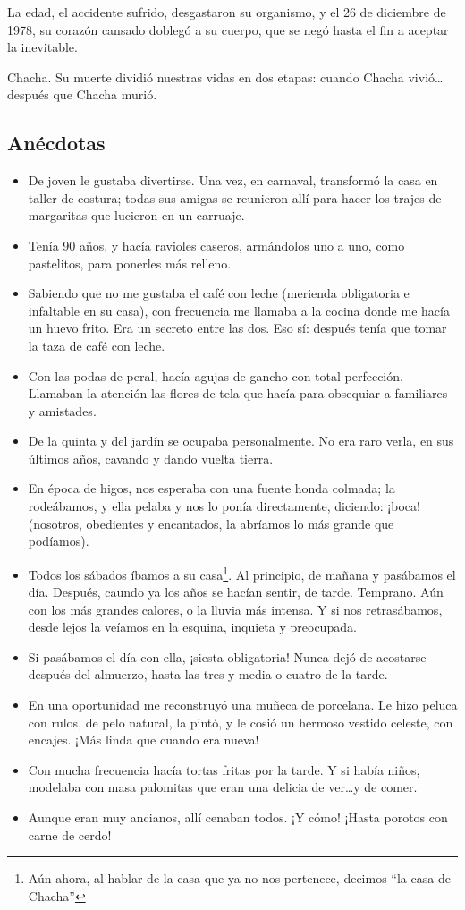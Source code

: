 \documentclass[a4paper]{article}
\begin{document}
La edad, el accidente sufrido, desgastaron su organismo, y el 26 de diciembre de 1978, su corazón cansado doblegó a su cuerpo, que se negó hasta el fin a aceptar la inevitable.

Chacha. Su muerte dividió nuestras vidas en dos etapas: cuando Chacha vivió\ldots después que Chacha murió.

\subsection{Anécdotas}

\begin{itemize}
    \item{De joven le gustaba divertirse. Una vez, en carnaval, transformó la casa en taller de costura; todas sus amigas se reunieron allí para hacer los trajes de margaritas que lucieron en un carruaje.}
    \item{Tenía 90 años, y hacía ravioles caseros, armándolos uno a uno, como pastelitos, para ponerles más relleno.}
    \item{Sabiendo que no me gustaba el café con leche (merienda obligatoria e infaltable en su casa), con frecuencia me llamaba a la cocina donde me hacía un huevo frito. Era un secreto entre las dos. Eso sí: después tenía que tomar la taza de café con leche.}
    \item{Con las podas de peral, hacía agujas de gancho con total perfección. Llamaban la atención las flores de tela que hacía para obsequiar a familiares y amistades.}
    \item{De la quinta y del jardín se ocupaba personalmente. No era raro verla, en sus últimos años, cavando y dando vuelta tierra.}
    \item{En época de higos, nos esperaba con una fuente honda colmada; la rodeábamos, y ella pelaba y nos lo ponía directamente, diciendo: ¡boca! (nosotros, obedientes y encantados, la abríamos lo más grande que podíamos).}
    \item{Todos los sábados íbamos a su casa\footnote{Aún ahora, al hablar de la casa que ya no nos pertenece, decimos ``la casa de Chacha''}. Al principio, de mañana y pasábamos el día. Después, caundo ya los años se hacían sentir, de tarde. Temprano. Aún con los más grandes calores, o la lluvia más intensa. Y si nos retrasábamos, desde lejos la veíamos en la esquina, inquieta y preocupada.}
    \item{Si pasábamos el día con ella, ¡siesta obligatoria! Nunca dejó de acostarse después del almuerzo, hasta las tres y media o cuatro de la tarde.}
    \item{En una oportunidad me reconstruyó una muñeca de porcelana. Le hizo peluca con rulos, de pelo natural, la pintó, y le cosió un hermoso vestido celeste, con encajes. ¡Más linda que cuando era nueva!}
    \item{Con mucha frecuencia hacía tortas fritas por la tarde. Y si había niños, modelaba con masa palomitas que eran una delicia de ver\ldots y de comer.}
    \item{Aunque eran muy ancianos, allí cenaban todos. ¡Y cómo! ¡Hasta porotos con carne de cerdo!}
\end{itemize}
\end{document}
